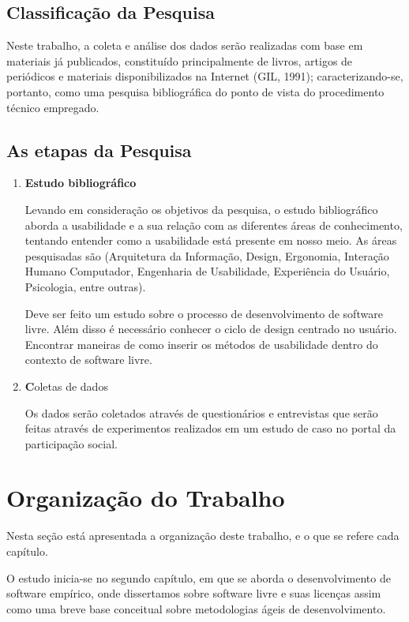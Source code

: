 \subsection{Classificação da Pesquisa}

Neste trabalho, a coleta e análise dos dados serão realizadas com base em  materiais já publicados, constituído principalmente de livros, artigos de periódicos e  materiais disponibilizados na Internet (GIL, 1991); caracterizando-se, portanto, como uma pesquisa bibliográfica do ponto de vista do procedimento técnico empregado. 


\subsection{As etapas da Pesquisa}

\begin{enumerate}
\item \textbf{Estudo bibliográfico}

Levando em consideração os objetivos da pesquisa, o estudo bibliográfico aborda a usabilidade e a sua relação com as diferentes áreas de conhecimento, tentando entender como a usabilidade está presente em nosso meio. As áreas pesquisadas são (Arquitetura da Informação, Design, Ergonomia, Interação Humano Computador, Engenharia de Usabilidade, Experiência do Usuário, Psicologia, entre outras).

Deve ser feito um estudo sobre o processo  de desenvolvimento de software livre. Além disso é necessário conhecer o ciclo de design centrado no usuário. Encontrar maneiras de como inserir os métodos de usabilidade dentro do contexto de software livre. 

\item \textbf Coletas de dados

Os dados serão coletados através de questionários e entrevistas que serão feitas através de experimentos realizados em um estudo de caso no portal da participação social.

\end{enumerate}

\section{Organização do Trabalho}

Nesta seção está apresentada a organização deste trabalho, e o que se refere cada capítulo.

O estudo inicia-se no segundo capítulo, em que se aborda o desenvolvimento de software empírico, onde dissertamos sobre software livre e suas licenças assim como uma breve base conceitual sobre metodologias ágeis de desenvolvimento.
	
